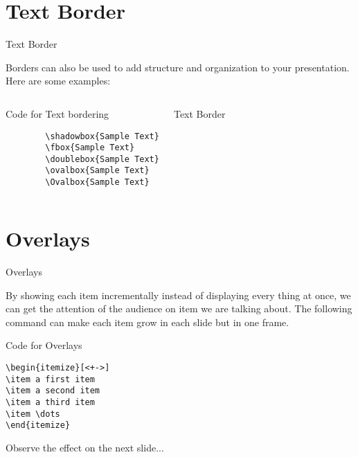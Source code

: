 \documentclass[10pt,xcolor=x11names]{beamer}
\begin{document}
\section{Text Border}
\begin{frame}[fragile]{Text Border} \vspace{-20pt}

Borders can also be used to add structure and organization to your presentation. Here are
some examples:

\begin{columns}[t]
	\begin{exampleblock}{Code for Text bordering }
		\begin{verbatim}
		\shadowbox{Sample Text}
		\fbox{Sample Text}
		\doublebox{Sample Text}
		\ovalbox{Sample Text}
		\Ovalbox{Sample Text}
		\end{verbatim}
		
	\end{exampleblock}
	\begin{exampleblock}{Text Border}
	\\
	\vspace{4pt}
	\\
	\vspace{4pt}
	\\
	\vspace{4pt}
	\\
	\vspace{4pt}
	\end{exampleblock}
\end{columns}

\end{frame}

\section{Overlays}
\begin{frame}[fragile]{Overlays} \vspace{-10pt}

By showing each item incrementally instead of displaying every thing at once, we can get the attention of the audience on item we are talking about. The following command can make each item grow in each slide but in one frame. \vspace{5pt}

\begin{exampleblock}{ Code for Overlays}
\begin{verbatim}
\begin{itemize}[<+->]
\item a first item
\item a second item
\item a third item
\item \dots
\end{itemize}	
\end{verbatim}	
\end{exampleblock} \vspace{10pt}
Observe the effect on the next slide...
\end{frame}
\end{document}
